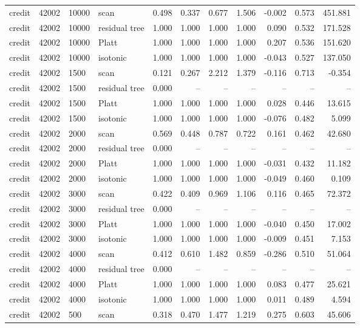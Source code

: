 \begin{tabular}{lrllrrrrrrr}
credit & 42002 & 10000 & scan & 0.498 & 0.337 & 0.677 & 1.506 & -0.002 & 0.573 & 451.881 \\
credit & 42002 & 10000 & residual tree & 1.000 & 1.000 & 1.000 & 1.000 & 0.090 & 0.532 & 171.528 \\
credit & 42002 & 10000 & Platt & 1.000 & 1.000 & 1.000 & 1.000 & 0.207 & 0.536 & 151.620 \\
credit & 42002 & 10000 & isotonic & 1.000 & 1.000 & 1.000 & 1.000 & -0.043 & 0.527 & 137.050 \\
credit & 42002 & 1500 & scan & 0.121 & 0.267 & 2.212 & 1.379 & -0.116 & 0.713 & -0.354 \\
credit & 42002 & 1500 & residual tree & 0.000 & -- & -- & -- & -- & -- & -- \\
credit & 42002 & 1500 & Platt & 1.000 & 1.000 & 1.000 & 1.000 & 0.028 & 0.446 & 13.615 \\
credit & 42002 & 1500 & isotonic & 1.000 & 1.000 & 1.000 & 1.000 & -0.076 & 0.482 & 5.099 \\
credit & 42002 & 2000 & scan & 0.569 & 0.448 & 0.787 & 0.722 & 0.161 & 0.462 & 42.680 \\
credit & 42002 & 2000 & residual tree & 0.000 & -- & -- & -- & -- & -- & -- \\
credit & 42002 & 2000 & Platt & 1.000 & 1.000 & 1.000 & 1.000 & -0.031 & 0.432 & 11.182 \\
credit & 42002 & 2000 & isotonic & 1.000 & 1.000 & 1.000 & 1.000 & -0.049 & 0.460 & 0.109 \\
credit & 42002 & 3000 & scan & 0.422 & 0.409 & 0.969 & 1.106 & 0.116 & 0.465 & 72.372 \\
credit & 42002 & 3000 & residual tree & 0.000 & -- & -- & -- & -- & -- & -- \\
credit & 42002 & 3000 & Platt & 1.000 & 1.000 & 1.000 & 1.000 & -0.040 & 0.450 & 17.002 \\
credit & 42002 & 3000 & isotonic & 1.000 & 1.000 & 1.000 & 1.000 & -0.009 & 0.451 & 7.153 \\
credit & 42002 & 4000 & scan & 0.412 & 0.610 & 1.482 & 0.859 & -0.286 & 0.510 & 51.064 \\
credit & 42002 & 4000 & residual tree & 0.000 & -- & -- & -- & -- & -- & -- \\
credit & 42002 & 4000 & Platt & 1.000 & 1.000 & 1.000 & 1.000 & 0.083 & 0.477 & 25.621 \\
credit & 42002 & 4000 & isotonic & 1.000 & 1.000 & 1.000 & 1.000 & 0.011 & 0.489 & 4.594 \\
credit & 42002 & 500 & scan & 0.318 & 0.470 & 1.477 & 1.219 & 0.275 & 0.603 & 45.606 \\

\end{tabular}
